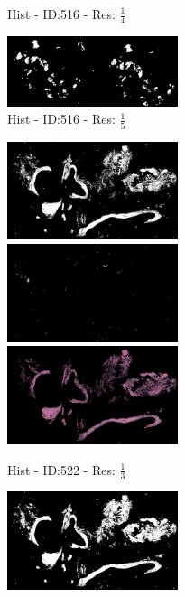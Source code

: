 \documentclass[letterpaper,10pt,oneside]{article}
\begin{document}
\begin{figure}[hbtp]
\begin{subfigure}[b]{5cm}
    \caption{Hist - ID:516 - Res: $\frac{1}{4}$}
  \end{subfigure}
  \begin{subfigure}[b]{5cm}
    \includegraphics[width=5cm]{visualization/results/histogramSeg/res_reduce_5/Region_0_PO13-00516A1_1_7_201305171148.png}
    \caption{Hist - ID:516 - Res: $\frac{1}{5}$}
  \end{subfigure}
  \begin{subfigure}[b]{5cm}
    \includegraphics[width=5cm]{visualization/results/histogramSeg/res_reduce_3/Region_0_PO13-00522A1_1_2_201305171639.png}
    \includegraphics[width=5cm]{visualization/results/histogramSeg/res_reduce_3/Region_1_PO13-00522A1_1_2_201305171639.png}
    \includegraphics[width=5cm]{visualization/results/histogramSeg/res_reduce_3/Region_2_PO13-00522A1_1_2_201305171639.png}
    \caption{Hist - ID:522 - Res: $\frac{1}{3}$}
  \end{subfigure}
  \begin{subfigure}[b]{5cm}
    \includegraphics[width=5cm]{visualization/results/histogramSeg/res_reduce_4/Region_0_PO13-00522A1_1_2_201305171639.png}

\end{subfigure}
\end{figure}
\end{document}
